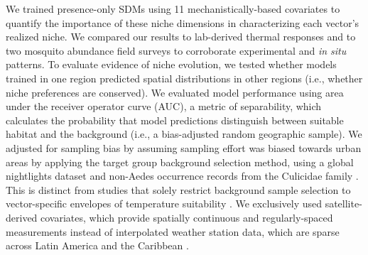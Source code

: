 \noindent We trained presence-only SDMs using 11 mechanistically-based covariates to quantify the importance of these niche dimensions in characterizing each vector’s realized niche. We compared our results to lab-derived thermal responses and to two mosquito abundance field surveys to corroborate experimental and \textit{in situ} patterns. To evaluate evidence of niche evolution, we tested whether models trained in one region predicted spatial distributions in other regions (i.e., whether niche preferences are conserved). We evaluated model performance using area under the receiver operator curve (AUC), a metric of separability, which calculates the probability that model predictions distinguish between suitable habitat and the background (i.e., a bias-adjusted random geographic sample). We adjusted for sampling bias by assuming sampling effort was biased towards urban areas by applying the target group background selection method, using a global nightlights dataset and non-Aedes occurrence records from the Culicidae family \cite{Phillips2009-nf, Merow2013-mw}. This is distinct from studies that solely restrict background sample selection to vector-specific envelopes of temperature suitability \cite{Brady2014-ti, Kraemer2015-ct}. We exclusively used satellite-derived covariates, which provide spatially continuous and regularly-spaced measurements instead of interpolated weather station data, which are sparse across Latin America and the Caribbean \cite{Fick2017-am}.

